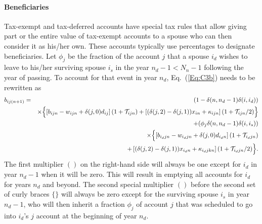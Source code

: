 \documentclass{report}[fleqn,12pt]
\begin{document}
\paragraph*{Beneficiaries}
Tax-exempt and tax-deferred accounts have special tax rules that allow giving part
or the entire value of
tax-exempt accounts to a spouse who can then consider it as his/her own.
These accounts typically use percentages to designate beneficiaries.
Let $\phi_j$ be the fraction of the account $j$ that a spouse $i_d$ wishes
to leave to his/her surviving spouse $i_s$
in the year $n_d  - 1 < N_n - 1$ following the year of passing. 
To account for that event in year $n_d$, Eq.~(\ref{Eq:C3b}) needs to be rewritten as
\begin{eqnarray}
	b_{ij(n+1)} &=& (1 - \delta(n, n_d-1)\delta(i, i_d)) \nonumber \\
	&&\times \Bigl\{\left[b_{ijn} - w_{ijn} + \delta(j, 0)d_{ij}\right](1 + \mathcal{T}_{ijn})
	+ \left[(\delta(j, 2) - \delta(j, 1))x_{in} + \kappa_{ijn}\right](1 + \mathcal{T}_{ijn}/2) 
	\Bigr\}\nonumber \\
	&& + (\phi_j\delta(n, n_d-1)\delta(i, i_s)) \nonumber  \\
	&& \times \Bigl\{\left[b_{i_djn} - w_{i_djn} + \delta(j, 0)d_{i_dn}\right](1 + \mathcal{T}_{i_djn})
	\nonumber\\
	&& + \left[(\delta(j, 2) - \delta(j, 1))x_{i_dn} + \kappa_{i_djkn}\right](1 + \mathcal{T}_{i_djn}/2) 
	\Bigr\}.
\end{eqnarray}
The first multiplier $()$ on the right-hand side will always be one except for $i_d$ in
year $n_d-1$ when it will be zero. This will result in emptying all accounts for $i_d$ for years
$n_d$ and beyond.
The second special multiplier $()$ before the second set of curly braces
$\{\}$ will always be zero except for the surviving
spouse $i_s$ in year $n_d-1$, who will then inherit a fraction $\phi_j$ of account $j$ that
was scheduled to go into $i_d$'s $j$ account at the beginning of year $n_d$.
\end{document}
